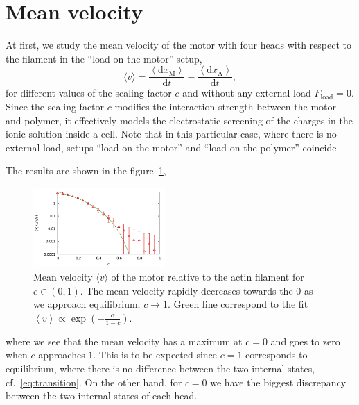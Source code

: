 \documentclass[aps,pre,twocolumn,showpacs,showkeys,superscriptaddress,floatfix]{revtex4-1}
\newcommand{\rmd}{{\mathrm d}}
\begin{document}
\section{Mean velocity}
\label{sec:velocity}
At first, we study the mean velocity of the motor with four heads with respect to the filament in the ``load on the motor'' setup,
\begin{equation}
\langle v \rangle 
= \frac{ \left\langle \rmd x_\text{M} \right\rangle }{ \rmd t } 
- \frac{ \left\langle \rmd x_\text{A} \right\rangle }{ \rmd t } ,
\label{eq:mean_velocity} 
\end{equation}
for different values of the scaling factor $c$ and without any external load $F_\text{load} = 0$.
Since the scaling factor $c$ modifies the interaction strength between the motor and polymer, it effectively models the electrostatic screening of the charges in the ionic solution inside a cell\cite{barterls1993myosin}.
Note that in this particular case, where there is no external load, setups ``load on the motor'' and ``load on the polymer'' coincide. 

The results are shown in the figure~\ref{fig:c_v},
\begin{figure}[t]
\centering
\includegraphics[width=0.45\textwidth,height=!]{c_v_4heads}
\caption{
\label{fig:c_v}
Mean velocity $\langle v \rangle$ of the motor relative to the actin filament for $c \in (0,1)$.
The mean velocity rapidly decreases towards the $0$ as we approach equilibrium, $c \to 1$.  
Green line correspond to the fit $ \left\langle v \right\rangle \propto \exp ( - \frac{\alpha}{1-c} ) $.
} 
\end{figure}
where we see that the mean velocity has a maximum at $c=0$ and goes to zero when $c$ approaches $1$. 
This is to be expected since $c=1$ corresponds to equilibrium, where there is no difference between the two internal states, cf.~\eqref{eq:transition}.
On the other hand, for $c=0$ we have the biggest discrepancy between the two internal states of each head. 
\end{document}
